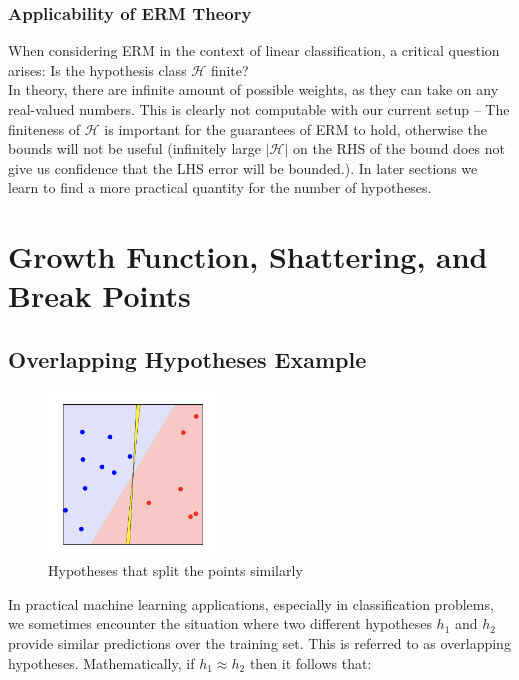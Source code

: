 \subsubsection*{Applicability of ERM Theory}
When considering ERM in the context of linear classification, a critical question arises: Is the hypothesis class \( \mathcal{H} \) finite? \\

In theory, there are infinite amount of possible weights, as they can take on any real-valued numbers. This is clearly not computable with our current setup – The finiteness of \( \mathcal{H} \) is important for the guarantees of ERM to hold, otherwise the bounds will not be useful (infinitely large $|\mathcal{H}|$ on the RHS of the bound does not give us confidence that the LHS error will be bounded.). In later sections we learn to find a more practical quantity for the number of hypotheses.\\



\section{Growth Function, Shattering, and Break Points}
\subsection{Overlapping Hypotheses Example}\label{overlap_hypo}

\begin{figure}[ht]
    \centering
    \includegraphics[width=0.4\textwidth]{img/h-overlap.png}
    \caption{Hypotheses that split the points similarly}
    \label{fig:h-overlap}
\end{figure}

In practical machine learning applications, especially in classification problems, we sometimes encounter the situation where two different hypotheses \( h_1 \) and \( h_2 \) provide similar predictions over the training set. This is referred to as overlapping hypotheses. Mathematically, if \( h_1 \approx h_2 \) then it follows that:

